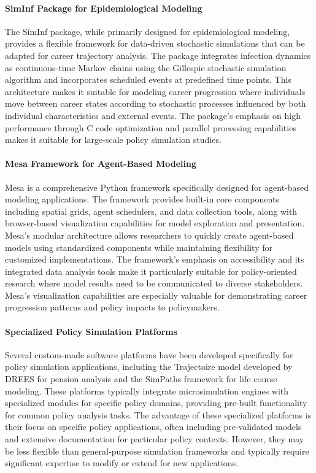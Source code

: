 \documentclass[main.tex]{subfiles}
\begin{document}
\paragraph{SimInf Package for Epidemiological Modeling}

The SimInf package, while primarily designed for epidemiological modeling, provides a flexible framework for data-driven stochastic simulations that can be adapted for career trajectory analysis\autocite{siminf}. The package integrates infection dynamics as continuous-time Markov chains using the Gillespie stochastic simulation algorithm and incorporates scheduled events at predefined time points. This architecture makes it suitable for modeling career progression where individuals move between career states according to stochastic processes influenced by both individual characteristics and external events. The package's emphasis on high performance through C code optimization and parallel processing capabilities makes it suitable for large-scale policy simulation studies.

\paragraph{Mesa Framework for Agent-Based Modeling}

Mesa is a comprehensive Python framework specifically designed for agent-based modeling applications\autocite{mesa}. The framework provides built-in core components including spatial grids, agent schedulers, and data collection tools, along with browser-based visualization capabilities for model exploration and presentation. Mesa's modular architecture allows researchers to quickly create agent-based models using standardized components while maintaining flexibility for customized implementations. The framework's emphasis on accessibility and its integrated data analysis tools make it particularly suitable for policy-oriented research where model results need to be communicated to diverse stakeholders. Mesa's visualization capabilities are especially valuable for demonstrating career progression patterns and policy impacts to policymakers.

\paragraph{Specialized Policy Simulation Platforms}

Several custom-made software platforms have been developed specifically for policy simulation applications, including the Trajectoire model developed by DREES for pension analysis\autocite{duc2015} and the SimPaths framework for life course modeling\autocite{bronka2023}. These platforms typically integrate microsimulation engines with specialized modules for specific policy domains, providing pre-built functionality for common policy analysis tasks. The advantage of these specialized platforms is their focus on specific policy applications, often including pre-validated models and extensive documentation for particular policy contexts. However, they may be less flexible than general-purpose simulation frameworks and typically require significant expertise to modify or extend for new applications.
\end{document}
